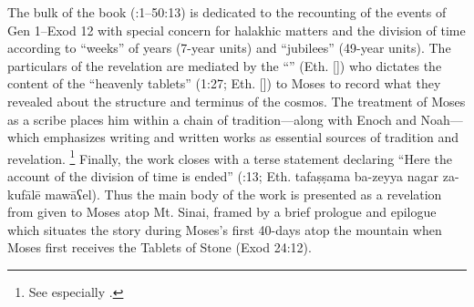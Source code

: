 The bulk of the book (:1--50:13) is dedicated to the recounting of the events of Gen 1--Exod 12 with special concern for halakhic matters and the division of time according to ``weeks'' of years (7-year units) and ``jubilees'' (49-year units). The particulars of the revelation are mediated by the ``\ap'' (Eth.  []) who dictates the content of the ``heavenly tablets'' (1:27; Eth.  []) to Moses to record what they revealed about the structure and terminus of the cosmos.\autocite{martinez_najman-tigchelaar2012} The treatment of Moses as a scribe places him within a chain of tradition---along with Enoch and Noah---which emphasizes writing and written works as essential sources of tradition and revelation.%
        \footnote{See especially
                \cite[381--388]{najman_jsj1999}.} 
Finally, the work closes with a terse statement declaring ``Here the account of the division of time is ended'' (:13; Eth. 
        {tafaṣṣama ba-zeyya nagar za-kufālē mawāʕel}).
Thus the main body of the work is presented as a revelation from \yahweh given to Moses atop Mt. Sinai, framed by a brief prologue and epilogue which situates the story during Moses's first 40-days atop the mountain when Moses first receives the Tablets of Stone (Exod 24:12).\autocite[1:129]{vanderkam2018}


